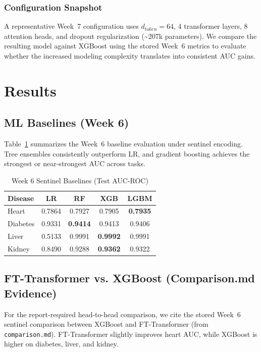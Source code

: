 \documentclass[journal]{IEEEtran}
\begin{document}
\subsubsection{Configuration Snapshot}
A representative Week~7 configuration uses $d_{token}=64$, 4 transformer layers, 8 attention heads, and dropout regularization (\mbox{\textasciitilde}207k parameters). We compare the resulting model against XGBoost using the stored Week~6 metrics to evaluate whether the increased modeling complexity translates into consistent AUC gains.

\section{Results}
\subsection{ML Baselines (Week 6)}
Table~\ref{tab:week6} summarizes the Week~6 baseline evaluation under sentinel encoding. Tree ensembles consistently outperform LR, and gradient boosting achieves the strongest or near-strongest AUC across tasks.

\begin{table}[t]
\centering
\caption{Week 6 Sentinel Baselines (Test AUC-ROC)}
\label{tab:week6}
\small
\begin{tabular}{lcccc}
\toprule
\textbf{Disease} & \textbf{LR} & \textbf{RF} & \textbf{XGB} & \textbf{LGBM} \\
\midrule
Heart   & 0.7864 & 0.7927 & 0.7905 & \textbf{0.7935} \\
Diabetes& 0.9331 & \textbf{0.9414} & 0.9413 & 0.9406 \\
Liver   & 0.5133 & 0.9991 & \textbf{0.9992} & 0.9991 \\
Kidney  & 0.8490 & 0.9288 & \textbf{0.9362} & 0.9322 \\
\bottomrule
\end{tabular}
\end{table}

\subsection{FT-Transformer vs. XGBoost (Comparison.md Evidence)}
For the report-required head-to-head comparison, we cite the stored Week~6 sentinel comparison between XGBoost and FT-Transformer (from \texttt{comparison.md}). FT-Transformer slightly improves heart AUC, while XGBoost is higher on diabetes, liver, and kidney.
\end{document}
